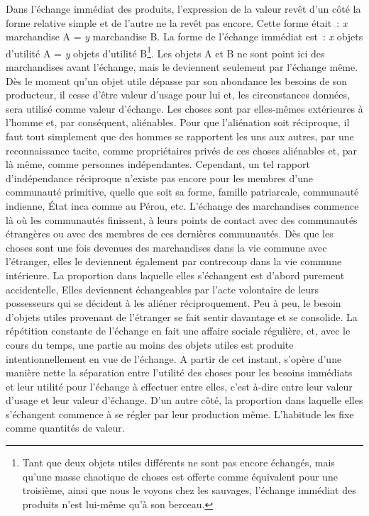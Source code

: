 \documentclass[french,twoside]{book} %
\begin{document}
Dans l’échange immédiat des produits, l’expression de la valeur revêt d’un côté la forme relative simple et de l’autre ne la revêt pas encore. Cette forme était : \emph{x} marchandise A = \emph{y} marchandise B. La forme de l’échange immédiat est : \emph{x} objets d’utilité A = \emph{y} objets d’utilité B\footnote{Tant que deux objets utiles différents ne sont pas encore échangés, mais qu’une masse chaotique de choses est offerte comme équivalent pour une troisième, ainsi que nous le voyons chez les sauvages, l’échange immédiat des produits n’est lui-même qu’à son berceau.}. Les objets A et B ne sont point ici des marchandises avant l’échange, mais le deviennent seulement par l’échange même. Dès le moment qu’un objet utile dépasse par son abondance les besoins de son producteur, il cesse d’être valeur d’usage pour lui et, les circonstances données, sera utilisé comme valeur d’échange. Les choses sont par elles-mêmes extérieures à l’homme et, par conséquent, aliénables. Pour que l’aliénation soit réciproque, il faut tout simplement que des hommes se rapportent les uns aux autres, par une reconnaissance tacite, comme propriétaires privés de ces choses aliénables et, par là même, comme personnes indépendantes. Cependant, un tel rapport d’indépendance réciproque n’existe pas encore pour les membres d’une communauté primitive, quelle que soit sa forme, famille patriarcale, communauté indienne, État inca comme au Pérou, etc. L’échange des marchandises commence là où les communautés finissent, à leurs points de contact avec des communautés étrangères ou avec des membres de ces dernières communautés. Dès que les choses sont une fois devenues des marchandises dans la vie commune avec l’étranger, elles le deviennent également par contrecoup dans la vie commune intérieure. La proportion dans laquelle elles s’échangent est d’abord purement accidentelle, Elles deviennent échangeables par l’acte volontaire de leurs possesseurs qui se décident à les aliéner réciproquement. Peu à peu, le besoin d’objets utiles provenant de l’étranger se fait sentir davantage et se consolide. La répétition constante de l’échange en fait une affaire sociale régulière, et, avec le cours du temps, une partie au moins des objets utiles est produite intentionnellement en vue de l’échange. A partir de cet instant, s’opère d’une manière nette la séparation entre l’utilité des choses pour les besoins immédiats et leur utilité pour l’échange à effectuer entre elles, c’est à-dire entre leur valeur d’usage et leur valeur d’échange. D’un autre côté, la proportion dans laquelle elles s’échangent commence à se régler par leur production même. L’habitude les fixe comme quantités de valeur.\par
\end{document}
